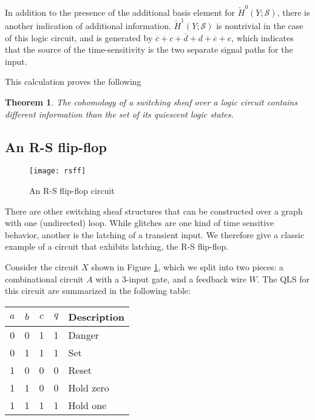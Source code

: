 \documentclass{amsart}
\theoremstyle{plain}
\newtheorem{thm}{Theorem}
\theoremstyle{definition}
\begin{document}
In addition to the presence of the additional basis element for
$\check{H}^0(Y;\mathcal{S})$, there is another indication of additional
information.  $\check{H}^1(Y;\mathcal{S})$ is nontrivial in the case of this
logic circuit, and is generated by
$\overline{c}+c+\overline{d}+d+\overline{e}+e$, which indicates that
the source of the time-sensitivity is the two separate signal paths
for the input.

This calculation proves the following 

\begin{thm}
The cohomology of a switching sheaf over a logic circuit contains
different information than the set of its quiescent logic states.
\end{thm}

\subsection{An R-S flip-flop}

\begin{figure}
\begin{center}
\texttt{[image: rsff]}
\caption{An R-S flip-flop circuit}
\label{rsff_fig}
\end{center}
\end{figure}

There are other switching sheaf structures that can be constructed over a graph with one (undirected) loop.  While glitches are one kind of time sensitive behavior, another is the latching of a transient input.  We therefore give a classic example of a circuit that exhibits latching, the R-S flip-flop.

Consider the circuit $X$ shown in Figure \ref{rsff_fig}, which we split into two pieces: a combinational circuit $A$ with a 3-input gate, and a feedback wire $W$.  The QLS for this circuit \cite{Shannon_1940} are summarized in the following table:

\begin{center}
\begin{tabular}{ccc|c|l}
$a$&$b$&$c$&$q$&Description\\
\hline
0&0&1&1&Danger\\
0&1&1&1&Set\\
1&0&0&0&Reset\\
1&1&0&0&Hold zero\\
1&1&1&1&Hold one\\
\end{tabular}
\end{center}
\end{document}
